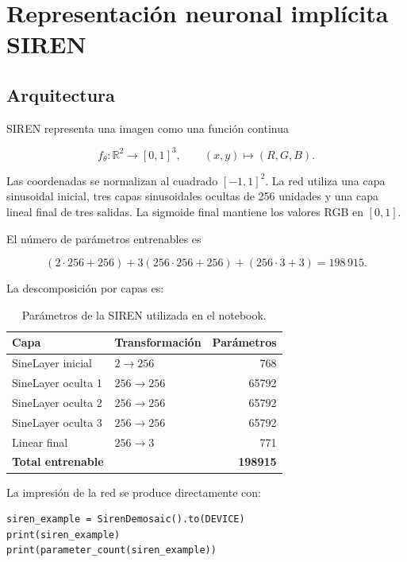 \documentclass[11pt,a4paper]{article}
\begin{document}
\section{Representación neuronal implícita SIREN}

\subsection{Arquitectura}

SIREN representa una imagen como una función continua

\begin{equation}
    f_\theta:\mathbb{R}^2\longrightarrow[0,1]^3,
    \qquad (x,y)\mapsto(R,G,B).
    \label{eq:siren-function}
\end{equation}

Las coordenadas se normalizan al cuadrado $[-1,1]^2$. La red utiliza una capa sinusoidal inicial, tres capas sinusoidales ocultas de 256 unidades y una capa lineal final de tres salidas. La sigmoide final mantiene los valores RGB en $[0,1]$.

El número de parámetros entrenables es

\begin{equation}
    (2\cdot256+256)+3(256\cdot256+256)+(256\cdot3+3)
    =198\,915.
    \label{eq:siren-params}
\end{equation}

La descomposición por capas es:

\begin{table}[H]
\centering
\caption{Parámetros de la SIREN utilizada en el notebook.}
\label{tab:siren-layers}
\begin{tabular}{p{5.0cm}p{4.0cm}r}
\toprule
Capa & Transformación & Parámetros\\
\midrule
SineLayer inicial & $2\to256$ & 768\\
SineLayer oculta 1 & $256\to256$ & 65792\\
SineLayer oculta 2 & $256\to256$ & 65792\\
SineLayer oculta 3 & $256\to256$ & 65792\\
Linear final & $256\to3$ & 771\\
\midrule
\textbf{Total entrenable} & & \textbf{198915}\\
\bottomrule
\end{tabular}
\end{table}

La impresión de la red se produce directamente con:

\begin{lstlisting}[caption={Impresión de la arquitectura SIREN.},label={lst:siren-summary}]
siren_example = SirenDemosaic().to(DEVICE)
print(siren_example)
print(parameter_count(siren_example))
\end{lstlisting}
\end{document}
